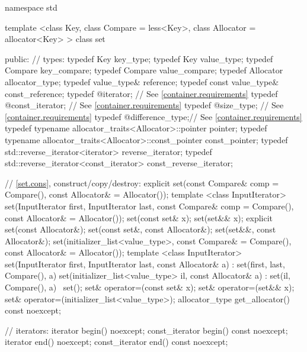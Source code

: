 \begin{codeblock}
namespace std {
  template <class Key, class Compare = less<Key>,
            class Allocator = allocator<Key> >
  class set {
  public:
    // types:
    typedef Key                                   key_type;
    typedef Key                                   value_type;
    typedef Compare                               key_compare;
    typedef Compare                               value_compare;
    typedef Allocator                             allocator_type;
    typedef value_type&                           reference;
    typedef const value_type&                     const_reference;
    typedef @\impdef@                iterator;       // See \ref{container.requirements}
    typedef @\impdef@                const_iterator; // See \ref{container.requirements}
    typedef @\impdef@                size_type;      // See \ref{container.requirements}
    typedef @\impdef@                difference_type;// See \ref{container.requirements}
    typedef typename allocator_traits<Allocator>::pointer           pointer;
    typedef typename allocator_traits<Allocator>::const_pointer     const_pointer;
    typedef std::reverse_iterator<iterator>       reverse_iterator;
    typedef std::reverse_iterator<const_iterator> const_reverse_iterator;

    // \ref{set.cons}, construct/copy/destroy:
    explicit set(const Compare& comp = Compare(),
                 const Allocator& = Allocator());
    template <class InputIterator>
      set(InputIterator first, InputIterator last,
          const Compare& comp = Compare(), const Allocator& = Allocator());
    set(const set& x);
    set(set&& x);
    explicit set(const Allocator&);
    set(const set&, const Allocator&);
    set(set&&, const Allocator&);
    set(initializer_list<value_type>,
      const Compare& = Compare(),
      const Allocator& = Allocator());
    template <class InputIterator>
    set(InputIterator first, InputIterator last, const Allocator& a)
      : set(first, last, Compare(), a) { }
    set(initializer_list<value_type> il, const Allocator& a)
      : set(il, Compare(), a) { }
   ~set();
    set& operator=(const set& x);
    set& operator=(set&& x);
    set& operator=(initializer_list<value_type>);
    allocator_type get_allocator() const noexcept;

    // iterators:
    iterator               begin() noexcept;
    const_iterator         begin() const noexcept;
    iterator               end() noexcept;
    const_iterator         end() const noexcept;

}}
\end{codeblock}

